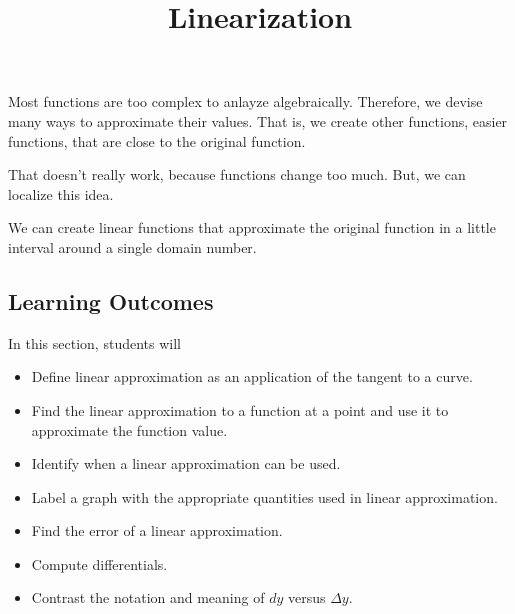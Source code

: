 \documentclass{ximera}
\title{Linearization}
\begin{document}
\begin{abstract}
\end{abstract}
\maketitle







Most functions are too complex to anlayze algebraically. Therefore, we devise many ways to approximate their values. That is, we create other functions, easier functions, that are close to the original function.

That doesn't really work, because functions change too much.  But, we can localize this idea.

We can create linear functions that approximate the original function in a little interval around a single domain number.











\subsection{Learning Outcomes}


\begin{sectionOutcomes}
In this section, students will 

\begin{itemize}
\item Define linear approximation as an application of the tangent to a curve.
\item Find the linear approximation to a function at a point and use it to approximate the function value.
\item Identify when a linear approximation can be used.
\item Label a graph with the appropriate quantities used in linear approximation.
\item Find the error of a linear approximation.
\item Compute differentials.
\item Contrast the notation and meaning of $dy$ versus $\Delta y$.
\end{itemize}
\end{sectionOutcomes}
\end{document}
